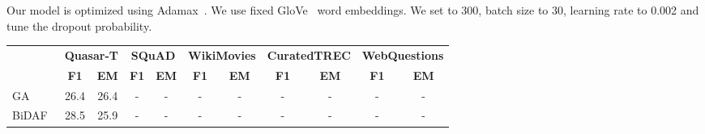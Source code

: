 \documentclass[letterpaper]{article} \usepackage{aaai18}  \usepackage{times}  \usepackage{helvet}  \usepackage{courier}  \usepackage{url}  \usepackage{graphicx}  \usepackage{comment}
\begin{document}
Our model is optimized using Adamax~\cite{kingma2014adam:iclr2015}. We use fixed GloVe~\cite{glove:emnlp2014} 
word embeddings.
We set  to 300, batch size to 30, learning rate to 0.002 and tune the dropout probability.


\begin{table*}[t]
\centering
\small
\begin{tabular}{lcccccccccc}
\toprule
                  & \multicolumn{2}{c}{\bf Quasar-T} & \multicolumn{2}{c}{\bf SQuAD} & \multicolumn{2}{c}{\bf WikiMovies}  & \multicolumn{2}{c}{\bf CuratedTREC} & \multicolumn{2}{c}{\bf WebQuestions}\\
                  & \bf F1            & \bf EM            & \bf F1            & \bf EM            & \bf F1               & \bf EM               & \bf F1               & \bf EM               & \bf F1               & \bf EM              \\
\midrule
GA~\cite{dhingra2016gated}               & 26.4          & 26.4          & -             & -             & -                & -                & -                & -                & -                & -               \\
BiDAF~\cite{seo2016bidirectional}           & 28.5          & 25.9          & -             & -             & -                & -                & -                & -                & -                & -               \\


\end{tabular}
\end{table*}
\end{document}
